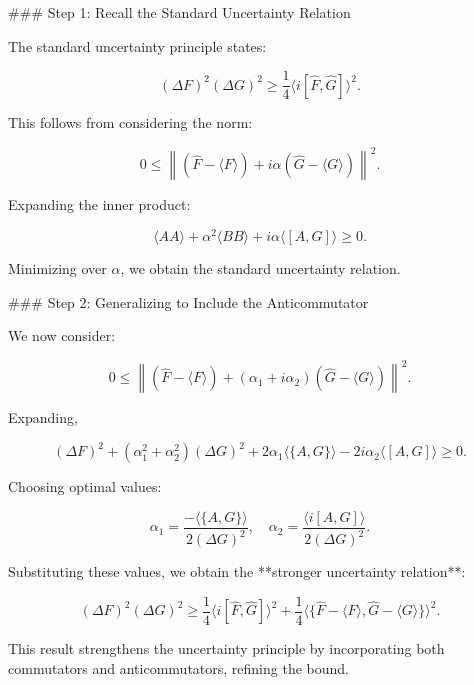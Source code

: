 \documentclass[12pt]{article}
\begin{document}
### Step 1: Recall the Standard Uncertainty Relation

The standard uncertainty principle states:

\begin{equation}
    (\Delta F)^2 (\Delta G)^2 \geq \frac{1}{4} \langle i [\hat{F}, \hat{G}] \rangle^2.
\end{equation}

This follows from considering the norm:

\begin{equation}
    0 \leq \left\| \left( \hat{F} - \langle F \rangle \right) + i\alpha \left( \hat{G} - \langle G \rangle \right) \right\|^2.
\end{equation}

Expanding the inner product:

\begin{equation}
    \langle A A \rangle + \alpha^2 \langle B B \rangle + i\alpha \langle [A, G] \rangle \geq 0.
\end{equation}

Minimizing over \( \alpha \), we obtain the standard uncertainty relation.

### Step 2: Generalizing to Include the Anticommutator

We now consider:

\begin{equation}
    0 \leq \left\| \left( \hat{F} - \langle F \rangle \right) + (\alpha_1 + i\alpha_2)(\hat{G} - \langle G \rangle) \right\|^2.
\end{equation}

Expanding,

\begin{equation}
    (\Delta F)^2 + (\alpha_1^2 + \alpha_2^2) (\Delta G)^2 + 2\alpha_1 \langle \{ A, G \} \rangle - 2 i \alpha_2 \langle [A, G] \rangle \geq 0.
\end{equation}

Choosing optimal values:

\begin{equation}
    \alpha_1 = \frac{-\langle \{ A, G \} \rangle}{2 (\Delta G)^2}, \quad \alpha_2 = \frac{\langle i [A, G] \rangle}{2 (\Delta G)^2}.
\end{equation}

Substituting these values, we obtain the **stronger uncertainty relation**:

\begin{equation}
    (\Delta F)^2 (\Delta G)^2 \geq \frac{1}{4} \langle i[\hat{F}, \hat{G}] \rangle^2 + \frac{1}{4} \langle \{ \hat{F} - \langle F \rangle, \hat{G} - \langle G \rangle \} \rangle^2.
\end{equation}

This result strengthens the uncertainty principle by incorporating both commutators and anticommutators, refining the bound.
\end{document}
